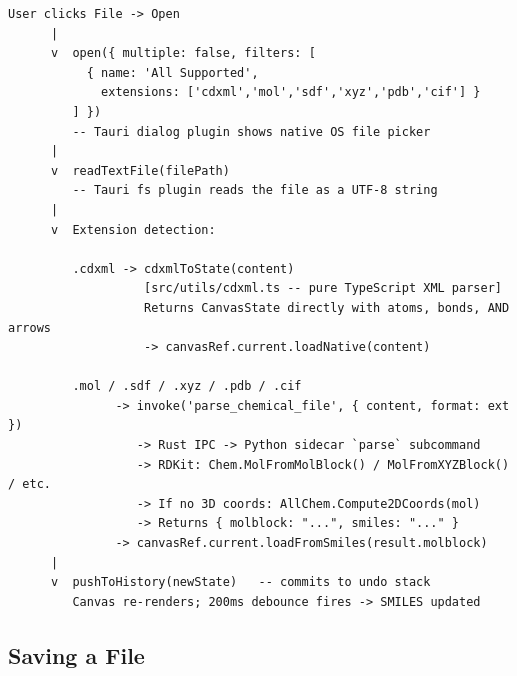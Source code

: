 \documentclass[11pt,a4paper]{article}
\begin{document}
\begin{lstlisting}[language={}]
User clicks File -> Open
      |
      v  open({ multiple: false, filters: [
           { name: 'All Supported',
             extensions: ['cdxml','mol','sdf','xyz','pdb','cif'] }
         ] })
         -- Tauri dialog plugin shows native OS file picker
      |
      v  readTextFile(filePath)
         -- Tauri fs plugin reads the file as a UTF-8 string
      |
      v  Extension detection:

         .cdxml -> cdxmlToState(content)
                   [src/utils/cdxml.ts -- pure TypeScript XML parser]
                   Returns CanvasState directly with atoms, bonds, AND arrows
                   -> canvasRef.current.loadNative(content)

         .mol / .sdf / .xyz / .pdb / .cif
               -> invoke('parse_chemical_file', { content, format: ext })
                  -> Rust IPC -> Python sidecar `parse` subcommand
                  -> RDKit: Chem.MolFromMolBlock() / MolFromXYZBlock() / etc.
                  -> If no 3D coords: AllChem.Compute2DCoords(mol)
                  -> Returns { molblock: "...", smiles: "..." }
               -> canvasRef.current.loadFromSmiles(result.molblock)
      |
      v  pushToHistory(newState)   -- commits to undo stack
         Canvas re-renders; 200ms debounce fires -> SMILES updated
\end{lstlisting}

\subsection{Saving a File}
\end{document}

